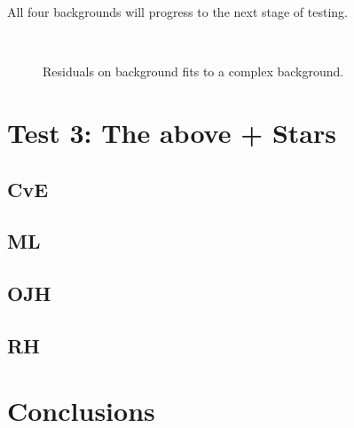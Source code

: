 \documentclass[10pt, a4paper]{article}
\begin{document}
All four backgrounds will progress to the next stage of testing.




\begin{figure}[!ht]
   \centering
   \quad
   \\
   \quad
   \caption{Residuals on background fits to a complex background.}
\end{figure}


\clearpage
\section{Test 3: The above + Stars}
\subsection{CvE}
\subsection{ML}
\subsection{OJH}
\subsection{RH}


\section{Conclusions}
\end{document}

